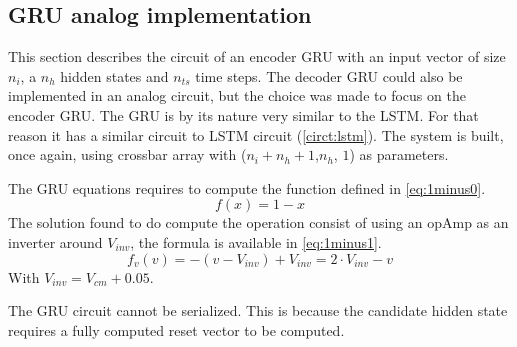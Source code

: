 \subsection{GRU analog implementation}

This section describes the circuit of an encoder \ac{GRU} with an input vector of size $n_i$, a $n_h$ hidden states and $n_{ts}$ time steps. The decoder \ac{GRU} could also be implemented in an analog circuit, but the choice was made to focus on the encoder \ac{GRU}. The \ac{GRU} is by its nature very similar to the \ac{LSTM}. For that reason it has a similar circuit to LSTM circuit (\cref{circt:lstm}). The system is built, once again, using crossbar array with ($n_i+n_h+1$,$n_h$, $1$) as parameters.

The GRU equations requires to compute the function defined in \cref{eq:1minus0}.
\begin{equation}\label{eq:1minus0}
  f(x)=1-x
\end{equation}
The solution found to do compute the operation consist of using an \ac{opAmp} as an inverter around $V_{inv}$, the formula is available in \cref{eq:1minus1}.
\begin{equation}\label{eq:1minus1}
  f_v(v)=-(v-V_{inv})+V_{inv}=2\cdot V_{inv} -v
\end{equation}
With $V_{inv}=V_{cm}+0.05$.

The GRU circuit cannot be serialized. This is because the candidate hidden state requires a fully computed reset vector to be computed.
